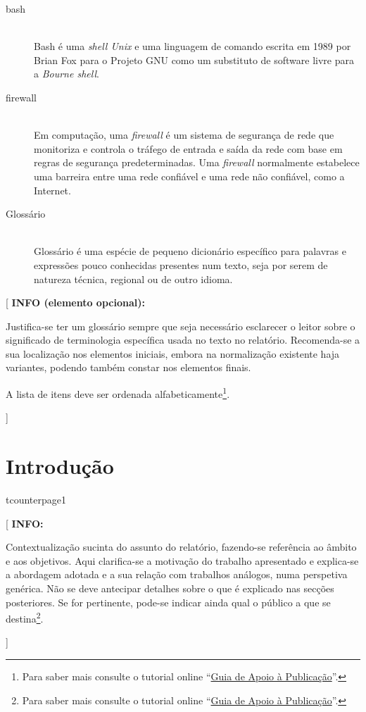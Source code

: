 \documentclass[11pt,a4paper]{report}
\newenvironment{info}[1]{\vspace*{6mm}\color{blue}[ \textbf{INFO:} \begin{em} #1}
                        {\vspace*{3mm}\end{em} ]}
\newenvironment{infoopt}[1]{\vspace*{6mm}\color{blue}[ \textbf{INFO (elemento opcional):} \begin{em} #1}
                        {\vspace*{3mm}\end{em} ]}
\begin{document}
\begin{description}
\item[bash] \hfill \\
  Bash é uma \emph{shell Unix} e uma linguagem de comando escrita 
  em 1989 por Brian Fox para o Projeto GNU como um substituto de 
  software livre para a \emph{Bourne shell}.
\item[firewall] \hfill \\
  Em computação, uma \emph{firewall} é um sistema de segurança de rede 
  que monitoriza e controla o tráfego de entrada e saída da rede 
  com base em regras de segurança predeterminadas.
  Uma \emph{firewall} normalmente estabelece uma barreira entre uma 
  rede confiável e uma rede não confiável, como a Internet.
\item[Glossário] \hfill \\
  Glossário é uma espécie de pequeno dicionário específico para
  palavras e expressões pouco conhecidas presentes num texto, seja
  por serem de natureza técnica, regional ou de outro idioma.
\end{description}

\begin{infoopt}
Justifica-se ter um glossário sempre que seja necessário esclarecer o leitor sobre o significado de terminologia específica usada no texto no relatório.
Recomenda-se a sua localização nos elementos iniciais, embora na
normalização existente haja variantes, podendo também constar nos
elementos finais.

A lista de itens deve ser ordenada alfabeticamente\footnote{%
Para saber mais consulte o tutorial online 
``\href{https://docs.google.com/document/d/1TDC1behVq8x7fQL4CcPEEh_np5GXviJevQxnQ9gbiJs/edit}
{Guia de Apoio à Publicação}''.}.
\end{infoopt}


\chapter{Introdução}

\pagestyle{fancy}
\se   tcounter{page}{1}

\begin{info}
Contextualização sucinta do assunto do relatório, fazendo-se
referência ao âmbito e aos objetivos.
Aqui clarifica-se a motivação do trabalho apresentado e explica-se a
abordagem adotada e a sua relação com trabalhos análogos, numa
perspetiva genérica.
Não se deve antecipar detalhes sobre o que é explicado nas secções
posteriores. 
Se for pertinente, pode-se indicar ainda qual o público a que se
destina\footnote{%
Para saber mais consulte o tutorial online 
``\href{https://docs.google.com/document/d/1TDC1behVq8x7fQL4CcPEEh_np5GXviJevQxnQ9gbiJs/edit}
{Guia de Apoio à Publicação}''.}.
\end{info}
\end{document}
